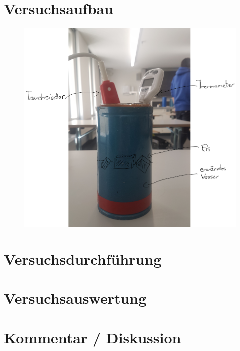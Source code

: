 \documentclass[a4 paper, 11pt]{article}
\begin{document}
\section{Versuchsaufbau}
\begin{figure}[H]
    \centering
    \includegraphics[width=\linewidth]{image}
\end{figure}

\section{Versuchsdurchführung}
\section{Versuchsauswertung}
\section{Kommentar / Diskussion}
\end{document}
